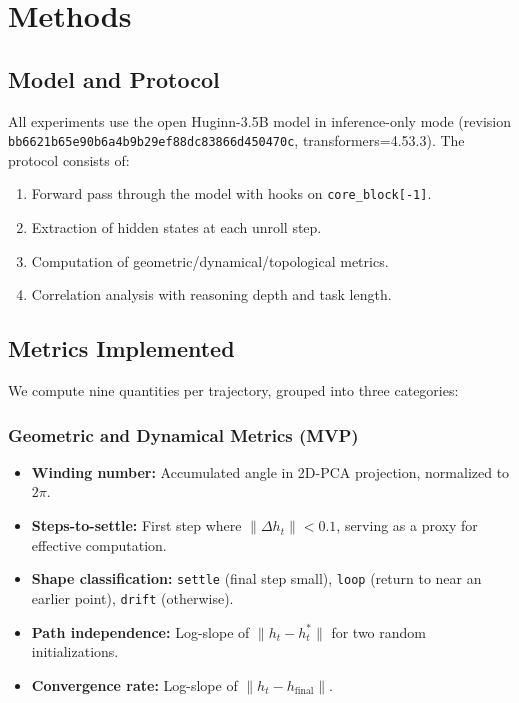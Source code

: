 \documentclass[12pt,a4paper]{article}
\begin{document}
\section{Methods}

\subsection{Model and Protocol}

All experiments use the open Huginn-3.5B model \cite{geiping2025scaling} in inference-only mode (revision \texttt{bb6621b65e90b6a4b9b29ef88dc83866d450470c}, transformers=4.53.3). The protocol consists of:

\begin{enumerate}
    \item Forward pass through the model with hooks on \texttt{core\_block[-1]}.
    \item Extraction of hidden states at each unroll step.
    \item Computation of geometric/dynamical/topological metrics.
    \item Correlation analysis with reasoning depth and task length.
\end{enumerate}

\subsection{Metrics Implemented}

We compute nine quantities per trajectory, grouped into three categories:

\subsubsection{Geometric and Dynamical Metrics (MVP)}
\begin{itemize}
    \item \textbf{Winding number:} Accumulated angle in 2D-PCA projection, normalized to $2\pi$.
    \item \textbf{Steps-to-settle:} First step where $\|\Delta h_t\| < 0.1$, serving as a proxy for effective computation.
    \item \textbf{Shape classification:} \texttt{settle} (final step small), \texttt{loop} (return to near an earlier point), \texttt{drift} (otherwise).
    \item \textbf{Path independence:} Log-slope of $\|h_t - h_t^*\|$ for two random initializations.
    \item \textbf{Convergence rate:} Log-slope of $\|h_t - h_{\text{final}}\|$.
\end{itemize}
\end{document}
